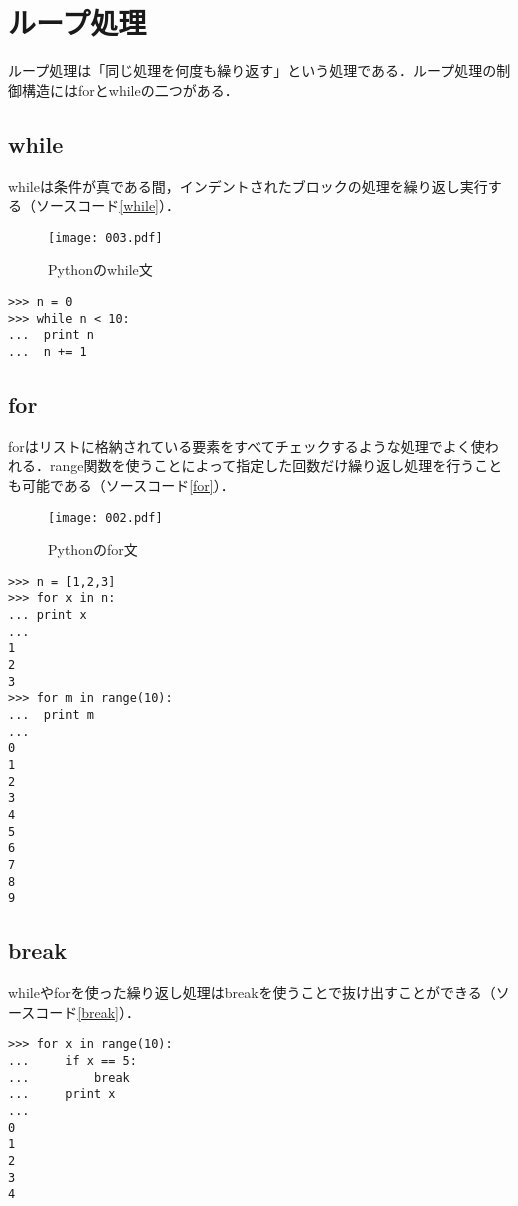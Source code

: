 \section{ループ処理}
ループ処理は「同じ処理を何度も繰り返す」という処理である．ループ処理の制御構造にはforとwhileの二つがある．
\subsection{while}
whileは条件が真である間，インデントされたブロックの処理を繰り返し実行する（ソースコード\ref{while}）．
\begin{figure}[htbp]
 \centering
  \texttt{[image: 003.pdf]}
  \caption{Pythonのwhile文}
  \label{scale}
\end{figure}

\begin{lstlisting}[caption=whileの使い方, label=while]
>>> n = 0
>>> while n < 10:
...	 print n
...	 n += 1
\end{lstlisting}

\subsection{for}
forはリストに格納されている要素をすべてチェックするような処理でよく使われる．range関数を使うことによって指定した回数だけ繰り返し処理を行うことも可能である（ソースコード\ref{for}）．
\begin{figure}[h]
 \centering
  \texttt{[image: 002.pdf]}
  \caption{Pythonのfor文}
\end{figure}

\begin{lstlisting}[caption=forの使い方, label=for]
>>> n = [1,2,3]
>>> for x in n:
...	print x 	
...
1
2
3
>>> for m in range(10):
...	 print m
...
0
1
2
3
4
5
6
7
8
9
\end{lstlisting}

\newpage
\subsection{break}
whileやforを使った繰り返し処理はbreakを使うことで抜け出すことができる（ソースコード\ref{break}）．
\begin{lstlisting}[caption=break, label=break]
>>> for x in range(10):
... 	if x == 5:
... 		break
... 	print x
...
0
1
2
3
4
\end{lstlisting}


